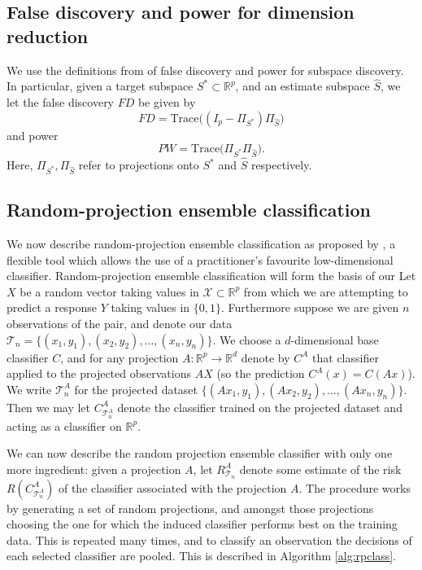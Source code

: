 \documentclass[12pt]{article}
\begin{document}
\subsection{False discovery and power for dimension reduction}
We use the definitions from \citet{taeb_false_2020} of false discovery and power for subspace discovery. In particular, given a target subspace $S^* \subset \mathbb{R}^p$, and an estimate subspace $\hat{S}$, we let the false discovery $FD$ be given by 
\[FD = \mathrm{Trace} \big( (I_p - \Pi_{S^*})\Pi_{\hat{S}} \big) \]
and power
\[PW = \mathrm{Trace} \big( \Pi_{S^*} \Pi_{\hat{S}} \big). \]
Here, $\Pi_{S^*}, \Pi_{\hat{S}}$ refer to projections onto $S^*$ and $\hat{S}$ respectively. 
\subsection{Random-projection ensemble classification}
We now describe random-projection ensemble classification as proposed by \citet{cannings_random-projection_2017}, a flexible tool which allows the use of a practitioner's favourite low-dimensional classifier. Random-projection ensemble classification will form the basis of our Let $X$ be a random vector taking values in $\mathcal{X} \subset \mathbb{R}^p$ from which we are attempting to predict a response $Y$ taking values in $\{0,1\}$. Furthermore suppose we are given $n$ observations of the pair, and denote our data $\mathcal{T}_n = \{(x_1, y_1), (x_2, y_2), \dots, (x_n, y_n)\}$. We choose a $d$-dimensional base classifier $C$, and for any projection $A:\mathbb{R}^p \rightarrow \mathbb{R}^d$ denote by $C^A$ that classifier applied to the projected observations $AX$ (so the prediction $C^A(x) = C(Ax)$). We write $\mathcal{T}_n^A$ for the projected dataset $\{(Ax_1, y_1), (Ax_2, y_2), \dots, (Ax_n, y_n)\}$. Then we may let $C^A_{\mathcal{T}_n^A}$ denote the classifier trained on the projected dataset and acting as a classifier on $\mathbb{R}^p$. 

We can now describe the random projection ensemble classifier with only one more ingredient: given a projection $A$, let $R^A_{\mathcal{T}_n}$ denote some estimate of the risk $R(C^A_{\mathcal{T}_n^A})$ of the classifier associated with the projection $A$. The procedure works by generating a set of random projections, and amongst those projections choosing the one for which the induced classifier performs best on the training data. This is repeated many times, and to classify an observation the decisions of each selected classifier are pooled. This is described in Algorithm \ref{alg:rpclass}.
\end{document}
